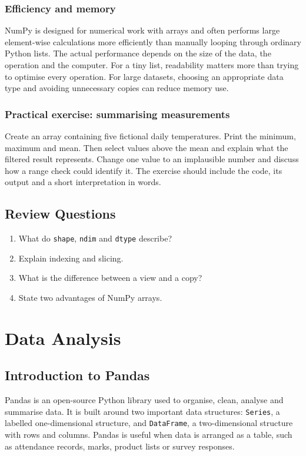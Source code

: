 \documentclass[11pt,openany,oneside]{book}
\begin{document}
\subsection{Efficiency and memory}
NumPy is designed for numerical work with arrays and often performs large element-wise calculations more efficiently than manually looping through ordinary Python lists. The actual performance depends on the size of the data, the operation and the computer. For a tiny list, readability matters more than trying to optimise every operation. For large datasets, choosing an appropriate data type and avoiding unnecessary copies can reduce memory use.

\subsection{Practical exercise: summarising measurements}
Create an array containing five fictional daily temperatures. Print the minimum, maximum and mean. Then select values above the mean and explain what the filtered result represents. Change one value to an implausible number and discuss how a range check could identify it. The exercise should include the code, its output and a short interpretation in words.

\section*{Review Questions}
\begin{enumerate}
\item What do \texttt{shape}, \texttt{ndim} and \texttt{dtype} describe?
\item Explain indexing and slicing.
\item What is the difference between a view and a copy?
\item State two advantages of NumPy arrays.
\end{enumerate}

\chapter{Data Analysis}
\section{Introduction to Pandas}
Pandas is an open-source Python library used to organise, clean, analyse and summarise data. It is built around two important data structures: \texttt{Series}, a labelled one-dimensional structure, and \texttt{DataFrame}, a two-dimensional structure with rows and columns. Pandas is useful when data is arranged as a table, such as attendance records, marks, product lists or survey responses.
\end{document}
